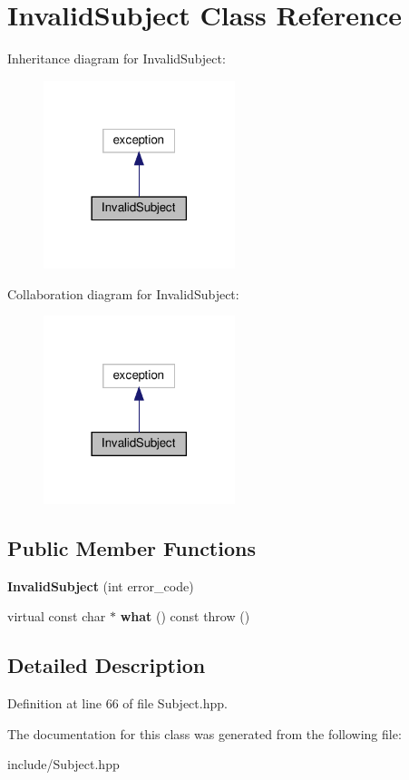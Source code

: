 \hypertarget{classInvalidSubject}{}\section{Invalid\+Subject Class Reference}
\label{classInvalidSubject}


Inheritance diagram for Invalid\+Subject\+:\nopagebreak
\begin{figure}[H]
\begin{center}
\leavevmode
\includegraphics[width=158pt]{classInvalidSubject__inherit__graph}
\end{center}
\end{figure}


Collaboration diagram for Invalid\+Subject\+:\nopagebreak
\begin{figure}[H]
\begin{center}
\leavevmode
\includegraphics[width=158pt]{classInvalidSubject__coll__graph}
\end{center}
\end{figure}
\subsection*{Public Member Functions}
\begin{DoxyCompactItemize}
\item 
\mbox{\label{classInvalidSubject_accec9773905ac5c51bbc73eb02fffe7b}} 
{\bfseries Invalid\+Subject} (int error\+\_\+code)
\item 
\mbox{\label{classInvalidSubject_a41dcf5036269f11d1d6918950c8f0997}} 
virtual const char $\ast$ {\bfseries what} () const  throw ()
\end{DoxyCompactItemize}


\subsection{Detailed Description}


Definition at line 66 of file Subject.\+hpp.



The documentation for this class was generated from the following file\+:\begin{DoxyCompactItemize}
\item 
include/Subject.\+hpp\end{DoxyCompactItemize}
